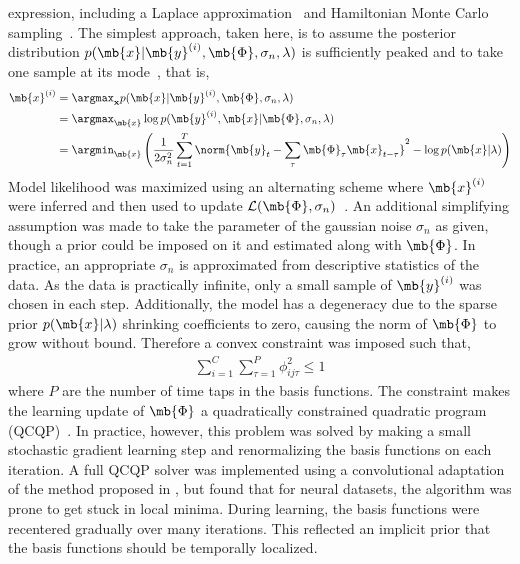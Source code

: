 expression, including a Laplace
approximation~\cite{lewicki1999probabilistic} and Hamiltonian Monte
Carlo sampling~\cite{culpepperbuilding}. The simplest approach, taken
here, is to assume the posterior distribution $p(\mb{x} |
\mb{y}^{(i)}, \mb{\Phi}, \sigma_n, \lambda)$ is sufficiently peaked
and to take one sample at its mode~\cite{Olshausen97}, that is,
\begin{align}
  \mb{x}^{(i)} &= \argmax_{\mathbf{x}} p(\mb{x} | \mb{y}^{(i)},
  \mb{\Phi}, \sigma_n,
  \lambda) \nonumber \\
  &= \argmax_{\mb{x}} \log p(\mb{y}^{(i)}, \mb{x} |\mb{\Phi},
  \sigma_n, \lambda) \nonumber \\
  &= \argmin_{\mb{x}}\left( \frac{1}{2 \sigma_n^2} \sum_{t=1}^T
    \norm{\mb{y}_t - \sum_\tau \mb{\Phi}_\tau \mb{x}_{t-\tau}}^2 -
    \log p(\mb{x}|\lambda) \right)\label{eqn:inference}
\end{align}
Model likelihood was maximized using an alternating scheme where
$\mb{x}^{(i)}$ were inferred and then used to update
$\mathcal{L}(\mb{\Phi},\sigma_n)$~\cite{Olshausen97}. An additional
simplifying assumption was made to take the parameter of the gaussian
noise $\sigma_n$ as given, though a prior could be imposed on it and
estimated along with $\mb{\Phi}$. In practice, an appropriate
$\sigma_n$ is approximated from descriptive statistics of the data. As
the data is practically infinite, only a small sample of
$\mb{y}^{(i)}$ was chosen in each step. Additionally, the model has a
degeneracy due to the sparse prior $p(\mb{x}|\lambda)$ shrinking
coefficients to zero, causing the norm of $\mb{\Phi}$ to grow without
bound. Therefore a convex constraint was imposed such that,
\begin{align*}
  \sum_{i=1}^C\sum_{\tau=1}^P\phi_{ij\tau}^2 \le 1
\end{align*}
where $P$ are the number of time taps in the basis functions. The
constraint makes the learning update of $\mb{\Phi}$ a quadratically
constrained quadratic program (QCQP)~\cite{boyd2004convex}. In
practice, however, this problem was solved by making a small
stochastic gradient learning step and renormalizing the basis
functions on each iteration. A full QCQP solver was implemented using
a convolutional adaptation of the method proposed in
\citet{mairal2010online}, but found that for neural datasets, the
algorithm was prone to get stuck in local minima. During learning, the
basis functions were recentered gradually over many iterations. This
reflected an implicit prior that the basis functions should be
temporally localized.

